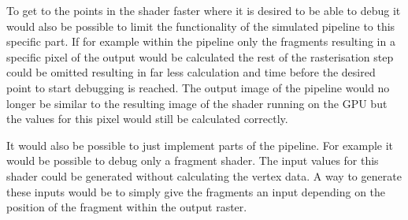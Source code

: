 To get to the points in the shader faster where it is desired to be able to debug it would also be possible to limit the functionality of the simulated pipeline to this specific part. If for example within the pipeline only the fragments resulting in a specific pixel of the output would be calculated the rest of the rasterisation step could be omitted resulting in far less calculation and time before the desired point to start debugging is reached. The output image of the pipeline would no longer be similar to the resulting image of the shader running on the GPU but the values for this pixel would still be calculated correctly.

It would also be possible to just implement parts of the pipeline. For example it would be possible to debug only a fragment shader. The input values for this shader could be generated without calculating the vertex data. A way to generate these inputs would be to simply give the fragments an input depending on the position of the fragment within the output raster.



